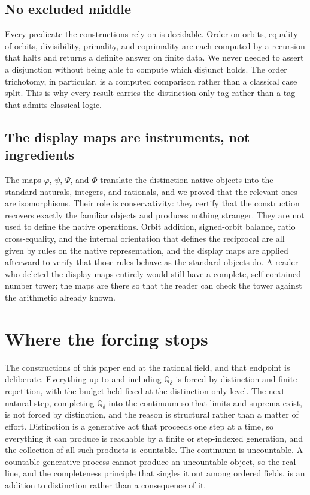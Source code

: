 \documentclass[11pt,a4paper]{article}
\theoremstyle{definition}
\theoremstyle{remark}
\newcommand{\Qd}{\mathbb{Q}_\delta}
\begin{document}
\subsection{No excluded middle}

Every predicate the constructions rely on is decidable. Order on orbits,
equality of orbits, divisibility, primality, and coprimality are each computed
by a recursion that halts and returns a definite answer on finite data. We never
needed to assert a disjunction without being able to compute which disjunct
holds. The order trichotomy, in particular, is a computed comparison rather than
a classical case split. This is why every result carries the distinction-only
tag rather than a tag that admits classical logic.

\subsection{The display maps are instruments, not ingredients}

The maps $\varphi$, $\psi$, $\Psi$, and $\Phi$ translate the
distinction-native objects into the standard naturals, integers, and rationals,
and we proved that the relevant ones are isomorphisms. Their role is
conservativity: they certify that the construction recovers exactly the familiar
objects and produces nothing stranger. They are not used to define the native
operations. Orbit addition, signed-orbit balance, ratio cross-equality, and the
internal orientation that defines the reciprocal are all given by rules on the
native representation, and the display maps are applied afterward to verify that
those rules behave as the standard objects do. A reader who deleted the display
maps entirely would still have a complete, self-contained number tower; the maps
are there so that the reader can check the tower against the arithmetic already
known.

\section{Where the forcing stops}\label{sec:boundary}

The constructions of this paper end at the rational field, and that endpoint is
deliberate. Everything up to and including $\Qd$ is forced by distinction and
finite repetition, with the budget held fixed at the distinction-only level. The
next natural step, completing $\Qd$ into the continuum so that limits and
suprema exist, is not forced by distinction, and the reason is structural rather
than a matter of effort. Distinction is a generative act that proceeds one step
at a time, so everything it can produce is reachable by a finite or
step-indexed generation, and the collection of all such products is countable.
The continuum is uncountable. A countable generative process cannot produce an
uncountable object, so the real line, and the completeness principle that
singles it out among ordered fields, is an addition to distinction rather than a
consequence of it.
\end{document}
